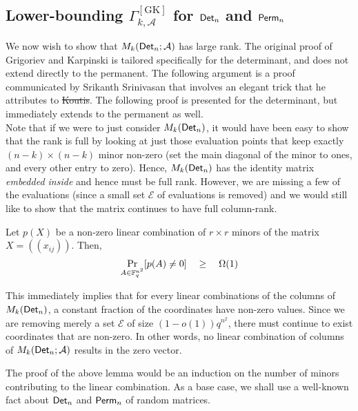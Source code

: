 \documentclass{birkjour}
\newcommand{\CM}[1]{\Gamma^{\mathrm{[#1]}}}
\providecommand{\DIFaddtex}[1]{{\protect\color{blue}\uwave{#1}}} %
\providecommand{\DIFdeltex}[1]{{\protect\color{red}\sout{#1}}}                      %
\providecommand{\DIFaddbegin}{} %
\providecommand{\DIFaddend}{} %
\providecommand{\DIFdelbegin}{} %
\providecommand{\DIFdelend}{} %
\providecommand{\DIFadd}[1]{\texorpdfstring{\DIFaddtex{#1}}{#1}} %
\providecommand{\DIFdel}[1]{\texorpdfstring{\DIFdeltex{#1}}{}} %
\begin{document}
\subsection{Lower-bounding $\CM{GK}_{k,\mathcal{A}}$ for $\mathsf{Det}_n$ and $\mathsf{Perm}_n$}

We now wish to show that $M_k(\mathsf{Det}_n;\mathcal{A})$ has large rank. The original proof of Grigoriev and Karpinski is tailored specifically for the determinant, and does not extend directly to the permanent. The following argument is a proof communicated by Srikanth Srinivasan \cite{Srikanth13} that involves an elegant trick that he attributes to \DIFdelbegin \DIFdel{Koutis}\DIFdelend \DIFaddbegin \DIFadd{\mbox{%
\cite{Koutis08}
}%
}\DIFaddend . The following proof is presented for the determinant, but immediately extends to the permanent as well. \\


Note that if we were to just consider $M_k(\mathsf{Det}_n)$, it would have been easy to show that the rank is full by looking at just those evaluation points that keep exactly \DIFaddbegin \DIFadd{one }\DIFaddend $(n-k)\times (n-k)$ minor non-zero (set the main diagonal of the minor to ones, and every other entry to zero). Hence, $M_k(\mathsf{Det}_n)$ has the identity matrix \emph{embedded inside} and hence must be full rank. However, we are missing a few of the evaluations (since a small set $\mathcal{E}$ of evaluations is removed) and we would still like to show that the matrix continues to have full column-rank. 

\begin{lemma}\label{lem:random-lc-det-nonzero}
  Let $p(X)$ be a non-zero linear combination of $r\times r$
  minors of the matrix $X = (\!(x_{ij})\!)$. Then, 
  $$
  \Pr_{A\in \mathbb{F}_q^{n^2}}[p(A) \neq 0] \quad \geq \quad \Omega(1)
  $$
\end{lemma}

This immediately implies that for every linear combinations of the columns of $M_k(\mathsf{Det}_n)$, a constant fraction of the coordinates have non-zero values. Since we are removing merely a set $\mathcal{E}$ of size $(1-o(1))q^{n^2}$, there must continue to exist coordinates that are non-zero. In other words, no linear combination of columns of $M_k(\mathsf{Det}_n;\mathcal{A})$ results in the zero vector. 


The proof of the above lemma would be an induction on the number of minors contributing to the linear combination. As a base case, we shall use a well-known fact about $\mathsf{Det}_n$ and $\mathsf{Perm}_n$ of random matrices. 
\end{document}
